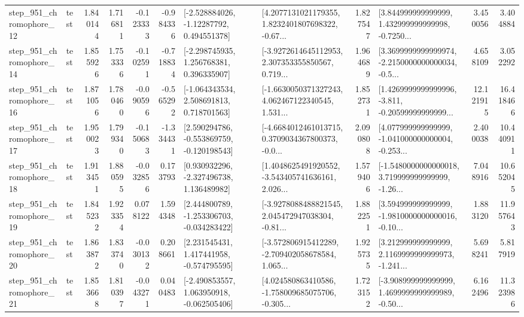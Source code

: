 \begin{tabular}{llrrrrllrlrr}
  step\_951\_chromophore\_12 &      test &      1.840144 &    1.716811 &     -0.123333 & -0.984336 &    [-2.528884026, -1.12287792, 0.494551378] &  [4.2077131021179355, 1.8232401807698322, -0.67... &       1.827547 &  [3.844999999999999, 1.432999999999998, -0.7250... &            3.450056 &          3.404884 \\
  step\_951\_chromophore\_14 &      test &      1.855926 &    1.753336 &     -0.102591 & -0.718834 &    [-2.298745935, 1.256768381, 0.396335907] &  [-3.9272614645112953, 2.307353355850567, 0.719... &       1.964689 &  [3.3699999999999974, -2.2150000000000034, -0.5... &            4.658109 &          3.052292 \\
  step\_951\_chromophore\_16 &      test &      1.871056 &    1.780460 &     -0.090596 & -0.565292 &    [-1.064343534, 2.508691813, 0.718701563] &  [-1.6630050371327243, 4.062467122340545, 1.531... &       1.852731 &  [1.4269999999999996, -3.811, -0.20599999999999... &           12.121915 &         16.418466 \\
  step\_951\_chromophore\_17 &      test &      1.950023 &    1.799340 &     -0.150683 & -1.334431 &   [2.590294786, -0.553869759, -0.120198543] &  [-4.6684012461013715, 0.3709034367800373, -0.0... &       2.090808 &  [4.077999999999999, -1.041000000000004, -0.253... &            2.400038 &         10.440911 \\
  step\_951\_chromophore\_18 &      test &      1.913451 &    1.880595 &     -0.032856 &  0.173793 &    [0.930932296, -2.327496738, 1.136489982] &  [1.4048625491920552, -3.543405741636161, 2.026... &       1.579406 &  [-1.5480000000000018, 3.719999999999999, -1.26... &            7.048916 &         10.652045 \\
  step\_951\_chromophore\_19 &      test &      1.845232 &    1.923354 &      0.078122 &  1.594348 &   [2.444800789, -1.253306703, -0.034283422] &  [-3.9278088488821545, 2.045472947038304, -0.81... &       1.882251 &  [3.594999999999999, -1.9810000000000016, -0.10... &            1.883120 &         11.957643 \\
  step\_951\_chromophore\_20 &      test &      1.863872 &    1.833740 &     -0.030132 &  0.208661 &    [2.231545431, 1.417441958, -0.574795595] &  [-3.572806915412289, -2.709402058678584, 1.065... &       1.925735 &  [3.212999999999999, 2.1169999999999973, -1.241... &            5.698241 &          5.817919 \\
  step\_951\_chromophore\_21 &      test &      1.853668 &    1.810397 &     -0.043271 &  0.040483 &   [-2.490853557, 1.063950918, -0.062505406] &  [4.024580863410586, -1.758009685075706, -0.305... &       1.723152 &  [-3.908999999999999, 1.4699999999999989, -0.50... &            6.162496 &         11.323986 \\

\end{tabular}
